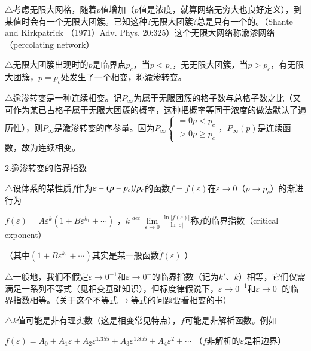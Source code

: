 \documentclass{article} %
\begin{document}
\noindent $\mathrm{\triangle}$考虑无限大网格，随着$p$值增加（$p$值是浓度，就算网络无穷大也良好定义），到某值时会有一个无限大团簇。已知这种?无限大团簇?总是只有一个的。（Shante and Kirkpatrick （1971）Adv. Phys. 20:325）这个无限大网络称渝渗网络（percolating network）

\noindent $\mathrm{\triangle}$无限大团簇出现时的$p$是临界点$p_{c} $，当$p<p_{c} $，无无限大团簇，当$p>p_{c} $，有无限大团簇，$p=p_{c} $处发生了一个相变，称渝渗转变。

\noindent $\mathrm{\triangle}$逾渗转变是一种连续相变。记$P_{\infty } $为属于无限团簇的格子数与总格子数之比（又可作为某已占格子属于无限大团簇的概率，这种把概率等同于浓度的做法默认了遍历性），则$P_{\infty } $是渝渗转变的序参量。因为$P_{\infty } \left\{\begin{array}{l} {=0p<p_{c} } \\ {>0p\ge p_{c} } \end{array}\right. $，$P_{\infty } \left(p\right)$是连续函数，故为连续相变。

\noindent 2.逾渗转变的临界指数

\noindent $\mathrm{\triangle}$设体系的某性质$f$作为$\varepsilon \equiv {(p-p_{c} )\mathord{\left/ {\vphantom {(p-p_{c} ) p_{c} }} \right. \kern-\nulldelimiterspace} p_{c} } $的函数$f=f\left(\varepsilon \right)$在$\varepsilon \to 0$（$p\to p_{c} $）的渐进行为

 $f\left(\varepsilon \right)=A\varepsilon ^{k} (1+B\varepsilon ^{k_{1} } +\cdots )$ ，$k{\mathop{=}\limits^{\mathit{det}}} {\mathop{\lim }\limits_{\varepsilon \to 0}} \frac{\ln \left|f\left(\varepsilon \right)\right|}{\ln \left|\varepsilon \right|} $称$f$的临界指数（critical exponent）

\noindent （其中$(1+B\varepsilon ^{k_{1} } +\cdots )$其实是某一般函数$\widetilde{f}\left(\varepsilon \right)$ ）

\noindent $\mathrm{\triangle}$一般地，我们不假定$\varepsilon \to 0^{-1} $和$\varepsilon \to 0^{-} $的临界指数（记为$k'$、$k$）相等，它们仅需满足一系列不等式（见相变基础知识），但标度律假说下，$\varepsilon \to 0^{-1} $和$\varepsilon \to 0^{-} $的临界指数相等。（关于这个不等式$\mathrm{\to}$等式的问题要看相变的书）

\noindent $\mathrm{\triangle}$$k$值可能是非有理实数（这是相变常见特点），$f$可能是非解析函数。例如

 $f\left(\varepsilon \right)=A_{0} +A_{1} \varepsilon +A_{2} \varepsilon ^{1.355} +A_{3} \varepsilon ^{1.855} +A_{4} \varepsilon ^{2} +\cdots $ （$f$非解析的$\varepsilon $是相边界）
\end{document}
